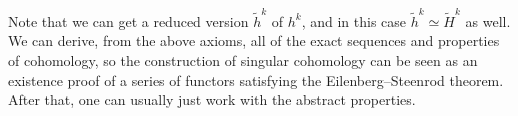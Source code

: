 \documentclass{tufte-handout}
\theoremstyle{definition}
\begin{document}
Note that we can get a reduced version $\widetilde{h}^k$ of $h^k$, and in this case $\widetilde{h}^k\simeq \widetilde{H}^k$ as well.
We can derive, from the above axioms, all of the exact sequences and properties of cohomology, so
the construction of singular cohomology can be seen as an existence proof of a series of functors satisfying
the Eilenberg--Steenrod theorem. After that, one can usually just work with the abstract properties.
\end{document}
